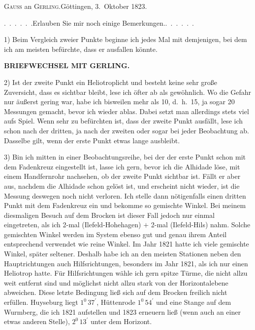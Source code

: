 \begin{center}
\textsc{Gauss} an \textsc{Gerling}.\quad Göttingen, 3.~Oktober 1823.
\end{center}

\par\noindent\hspace*{\parindent}\mbox{.\ .\ .\ .\ .\ .}\quad Erlauben Sie mir noch einige \mbox{Bemerkungen.\quad\mbox{.\ .\ .\ .\ .\ .}}
\par\noindent\hspace*{\parindent}1) Beim Vergleich zweier Punkte beginne ich jedes Mal mit demjenigen,
bei dem ich am meisten befürchte, dass er ausfallen könnte.
\par\clearpage
\noindent{}\hfill{\small\textbf{BRIEFWECHSEL MIT GERLING.}}\hfill\null\par\medskip
\par\noindent\hspace*{\parindent}2) Ist der zweite Punkt ein Heliotroplicht und besteht keine sehr große Zuversicht,
dass es sichtbar bleibt, lese ich öfter ab als gewöhnlich. Wo die Gefahr
nur äußerst gering war, habe ich bisweilen mehr als 10, d.~h.\ 15,
ja sogar 20 Messungen gemacht, bevor ich wieder ablas. Dabei setzt man
allerdings stets viel aufs Spiel. Wenn sehr zu befürchten ist, dass der zweite
Punkt ausfällt, lese ich schon nach der dritten, ja nach der zweiten oder sogar bei
jeder Beobachtung ab. Dasselbe gilt, wenn der erste Punkt etwas lange
ausbleibt.
\par\noindent\hspace*{\parindent}3) Bin ich mitten in einer Beobachtungsreihe, bei der der erste Punkt
schon mit dem Fadenkreuz eingestellt ist, lasse ich gern, bevor ich die Alhidade löse, mit einem
Handfernrohr nachsehen, ob der zweite Punkt sichtbar ist. Fällt er aber aus,
nachdem die Alhidade schon gelöst ist, und erscheint nicht wieder, ist die
Messung deswegen noch nicht verloren. Ich stelle dann nötigenfalls einen dritten Punkt mit dem Fadenkreuz ein
und bekomme so gemischte Winkel. Bei meinem diesmaligen Besuch auf dem Brocken
ist dieser Fall jedoch nur einmal eingetreten, als ich 2-mal
(Ilefeld-Hohehagen) \(+\) 2-mal (Ilefeld-Hils) nahm. Solche gemischten Winkel werden im
System ebenso gut und genau ihrem Anteil entsprechend verwendet wie reine Winkel. Im Jahr 1821 hatte
ich viele gemischte Winkel, später seltener. Deshalb habe ich an den
meisten Stationen neben den Hauptrichtungen auch Hilfsrichtungen, besonders im
Jahr 1821, als ich nur einen Heliotrop hatte. Für Hilfsrichtungen wähle ich
gern spitze Türme, die nicht allzu weit entfernt sind und möglichst nicht allzu stark
von der Horizontalebene abweichen. Diese letzte Bedingung ließ sich auf dem Brocken freilich
nicht erfüllen. Huyseburg liegt \(1^{0}\,37^{\prime}\), Hüttenrode \(1^{0}\,54^{\prime}\) und eine Stange
auf dem Wurmberg, die ich 1821 aufstellen und 1823 erneuern ließ
(wenn auch an einer etwas anderen Stelle), \(2^{0}\,13^{\prime}\) unter dem Horizont.
\par
